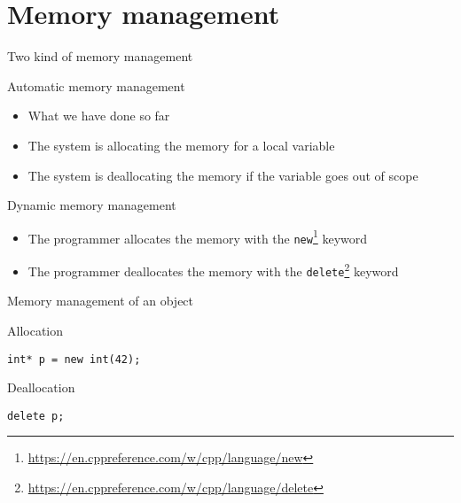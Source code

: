\documentclass[\classoption]{beamer}
\begin{document}
\section{Memory management}


\begin{frame}{Two kind of memory management}

\begin{block}{Automatic memory management}
\begin{itemize}
\item What we have done so far
\item The system is allocating the memory for a local variable
\item The system is deallocating the memory if the variable goes out of scope
\end{itemize}
\end{block}

\begin{block}{Dynamic memory management}
\begin{itemize}
\item The programmer allocates the memory with the \lstinline|new|\footnote{\tiny\url{https://en.cppreference.com/w/cpp/language/new}} keyword
\item The programmer deallocates the memory with the \lstinline|delete|\footnote{\tiny\url{https://en.cppreference.com/w/cpp/language/delete}} keyword
\end{itemize}
\end{block}

\end{frame}

\begin{frame}[fragile]{Memory management of an object}

\begin{block}{Allocation}
\begin{lstlisting}
int* p = new int(42);
\end{lstlisting}
\end{block}

\begin{block}{Deallocation}
\begin{lstlisting}
delete p;
\end{lstlisting}
\end{block}


\end{frame}
\end{document}
